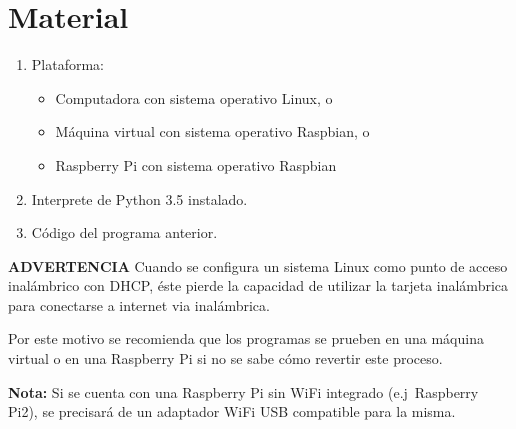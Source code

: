 %
%


\section{Material}%
\label{sec:material}
\begin{enumerate}[noitemsep]
	\item Plataforma:
	\begin{itemize}[nosep]
		\item Computadora con sistema operativo Linux, o
		\item Máquina virtual con sistema operativo Raspbian, o
		\item Raspberry Pi con sistema operativo Raspbian
	\end{itemize}
	\item Interprete de Python 3.5 instalado.
	\item Código del programa anterior.
\end{enumerate}

\begin{importantbox}{\bfseries ADVERTENCIA}
Cuando se configura un sistema Linux como punto de acceso inalámbrico con DHCP, éste pierde la capacidad de utilizar la tarjeta inalámbrica para conectarse a internet via inalámbrica.

Por este motivo se recomienda que los programas se prueben en una máquina virtual o en una Raspberry Pi si no se sabe cómo revertir este proceso.
\end{importantbox}

\textbf{Nota:} Si se cuenta con una Raspberry Pi sin WiFi integrado (e.j~Raspberry Pi2), se precisará de un adaptador WiFi USB compatible para la misma.
